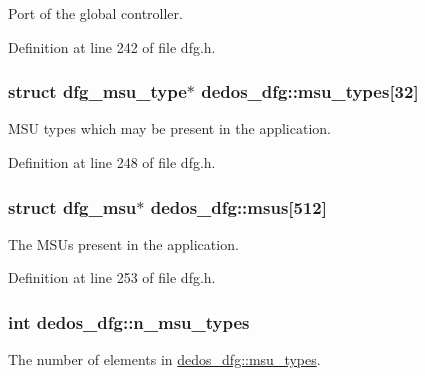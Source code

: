 Port of the global controller. 



Definition at line 242 of file dfg.\-h.

\hypertarget{structdedos__dfg_a6413c359339136a9acaf77df3b897305}{
\subsubsection[{msu\-\_\-types}]{\setlength{\rightskip}{0pt plus 5cm}struct {\bf dfg\-\_\-msu\-\_\-type}$\ast$ dedos\-\_\-dfg\-::msu\-\_\-types\mbox{[}32\mbox{]}}}\label{structdedos__dfg_a6413c359339136a9acaf77df3b897305}


M\-S\-U types which may be present in the application. 



Definition at line 248 of file dfg.\-h.

\hypertarget{structdedos__dfg_a5177dba1dea7f8f2fb383c5839c5f5f7}{
\subsubsection[{msus}]{\setlength{\rightskip}{0pt plus 5cm}struct {\bf dfg\-\_\-msu}$\ast$ dedos\-\_\-dfg\-::msus\mbox{[}512\mbox{]}}}\label{structdedos__dfg_a5177dba1dea7f8f2fb383c5839c5f5f7}


The M\-S\-Us present in the application. 



Definition at line 253 of file dfg.\-h.

\hypertarget{structdedos__dfg_ac78a52257324eec0ccf425530c84e91a}{
\subsubsection[{n\-\_\-msu\-\_\-types}]{\setlength{\rightskip}{0pt plus 5cm}int dedos\-\_\-dfg\-::n\-\_\-msu\-\_\-types}}\label{structdedos__dfg_ac78a52257324eec0ccf425530c84e91a}


The number of elements in \hyperlink{structdedos__dfg_a6413c359339136a9acaf77df3b897305}{dedos\-\_\-dfg\-::msu\-\_\-types}. 



